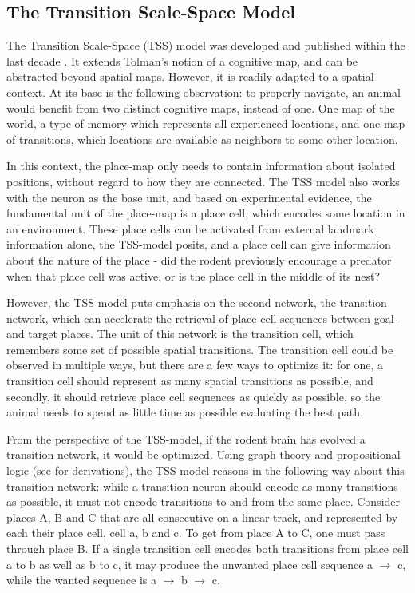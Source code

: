 \documentclass{article}
\begin{document}
    \subsection{The Transition Scale-Space Model} \label{TSS}
    The Transition Scale-Space (TSS) model was developed and published within the last decade \parencite{Waniek2020}. It extends Tolman's notion of a cognitive map, and can be abstracted beyond spatial maps. However, it is readily adapted to a spatial context. At its base is the following observation: to properly navigate, an animal would benefit from two distinct cognitive maps, instead of one. One map of the world, a type of memory which represents all experienced locations, and one map of transitions, which locations are available as neighbors to some other location.

    In this context, the place-map only needs to contain information about isolated positions, without regard to how they are connected. The TSS model also works with the neuron as the base unit, and based on experimental evidence, the fundamental unit of the place-map is a place cell, which encodes some location in an environment. These place cells can be activated from external landmark information alone, the TSS-model posits, and a place cell can give information about the nature of the place - did the rodent previously encourage a predator when that place cell was active, or is the place cell in the middle of its nest?

    However, the TSS-model puts emphasis on the second network, the transition network, which can accelerate the retrieval of place cell sequences between goal- and target places. The unit of this network is the transition cell, which remembers some set of possible spatial transitions. The transition cell could be observed in multiple ways, but there are a few ways to optimize it: for one, a transition cell should represent as many spatial transitions as possible, and secondly, it should retrieve place cell sequences as quickly as possible, so the animal needs to spend as little time as possible evaluating the best path.

    From the perspective of the TSS-model, if the rodent brain has evolved a transition network, it would be optimized. Using graph theory and propositional logic (see \cite{Waniek2018} for derivations), the TSS model reasons in the following way about this transition network: while a transition neuron should encode as many transitions as possible, it must not encode transitions to and from the same place. Consider places A, B and C that are all consecutive on a linear track, and represented by each their place cell, cell a, b and c. To get from place A to C, one must pass through place B. If a single transition cell encodes both transitions from place cell a to b as well as b to c, it may produce the unwanted place cell sequence a \(\rightarrow\) c, while the wanted sequence is a \(\rightarrow\) b \(\rightarrow\) c.
\end{document}
